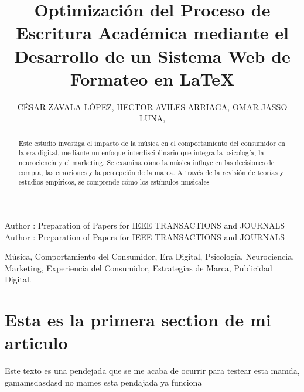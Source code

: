 \documentclass{ieeeaccess}
\begin{document}

\title{Optimización del Proceso de Escritura Académica mediante el Desarrollo de un Sistema Web de Formateo en LaTeX}
\author{\uppercase{César Zavala López},
\uppercase{Hector Aviles Arriaga},
\uppercase{Omar Jasso Luna},
}
\address[1]{Departamento de ITI, Universidad Politécnica de Victoria, Ciudad Victoria 87149, México (e-mail: cesarzavalamx15@gmail.com)}
\address[2]{Departamento de ITI, Universidad Politécnica de Victoria, Ciudad Victoria 87149, México (e-mail: havilesa@upv.edu.mx, ojassol@upv.edu.mx)}

\markboth
{Author \headeretal: Preparation of Papers for IEEE TRANSACTIONS and JOURNALS}
{Author \headeretal: Preparation of Papers for IEEE TRANSACTIONS and JOURNALS}


\begin{abstract}
Este estudio investiga el impacto de la música en el comportamiento del consumidor en la era digital, mediante un enfoque interdisciplinario que integra la psicología, la neurociencia y el marketing. Se examina cómo la música influye en las decisiones de compra, las emociones y la percepción de la marca. A través de la revisión de teorías y estudios empíricos, se comprende cómo los estímulos musicales
\end{abstract}

\begin{keywords}
Música, Comportamiento del Consumidor, Era Digital, Psicología, Neurociencia, Marketing, Experiencia del Consumidor, Estrategias de Marca, Publicidad Digital.
\end{keywords}

\titlepgskip=-15pt

\maketitle


\section{Esta es la primera section de mi articulo}
Este texto es una pendejada que se me acaba de ocurrir para testear esta mamda, gamamsdasdasd no mames esta pendajada ya funciona



\EOD
\end{document}
